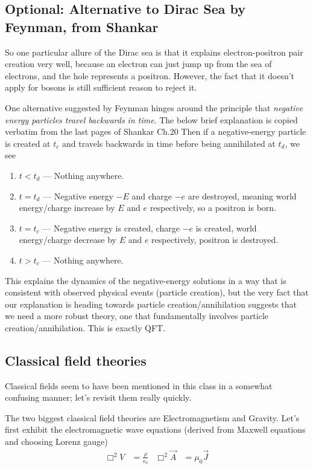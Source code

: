 \documentclass[12pt]{article}
\begin{document}
\subsection{Optional: Alternative to Dirac Sea by Feynman, from Shankar}

So one particular allure of the Dirac sea is that it explains electron-positron pair creation very well, because an electron can just jump up from the sea of electrons, and the hole represents a positron. However, the fact that it doesn't apply for bosons is still sufficient reason to reject it.

One alternative suggested by Feynman hinges around the principle that \emph{negative energy particles travel backwards in time}. The below brief explanation is copied verbatim from the last pages of Shankar Ch.20 Then if a negative-energy particle is created at $t_c$ and travels backwards in time before being annihilated at $t_d$, we see
\begin{enumerate}[1)]
    \item $t < t_d$ --- Nothing anywhere.
    \item $t = t_d$ --- Negative energy $-E$ and charge $-e$ are destroyed, meaning world energy/charge increase by $E$ and $e$ respectively, so a positron is born.
    \item $t = t_c$ --- Negative energy is created, charge $-e$ is created, world energy/charge decrease by $E$ and $e$ respectively, positron is destroyed.
    \item $t > t_c$ --- Nothing anywhere.
\end{enumerate}

This explains the dynamics of the negative-energy solutions in a way that is consistent with observed physical events (particle creation), but the very fact that our explanation is heading towards particle creation/annihilation suggests that we need a more robust theory, one that fundamentally involves particle creation/annihilation. This is exactly QFT.

\subsection{Classical field theories}

Classical fields seem to have been mentioned in this class in a somewhat confusing manner; let's revisit them really quickly.

The two biggest classical field theories are Electromagnetism and Gravity. Let's first exhibit the electromagnetic wave equations (derived from Maxwell equations and choosing Lorenz gauge)
\begin{align}
    \Box^2 V &= \frac{\rho}{\epsilon_0} & \Box^2\vec{A} &= \mu_0\vec{J}
\end{align}
\end{document}

